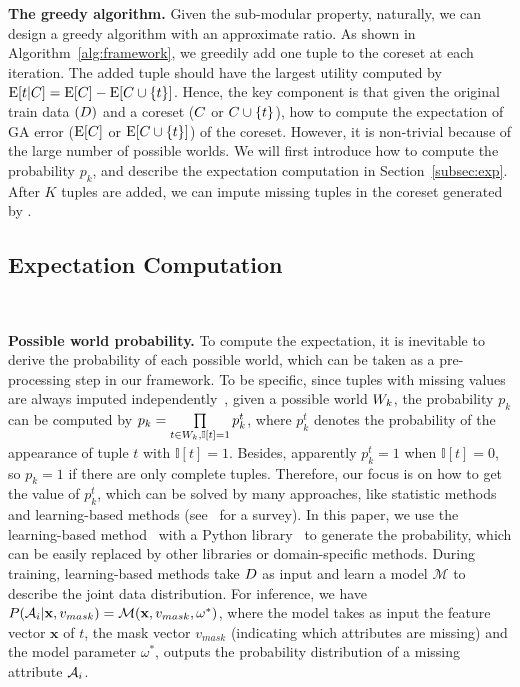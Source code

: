 \noindent \textbf{The greedy algorithm.} Given the sub-modular property, naturally, we can design a greedy algorithm with an approximate ratio. As shown in Algorithm~\ref{alg:framework}, we greedily add one tuple to the coreset at each iteration. The added tuple  should have the  largest utility computed by $\mathrm{E}[t|C] = \mathrm{E}[C] - \mathrm{E}[C \cup \{t\}]$. Hence, the key component is that given the original train data $(D)$ and a coreset ($C$ or $C \cup \{t\}$), how to compute the expectation of GA error ($\mathrm{E}[C]$ or $\mathrm{E}[C \cup \{t\}]$) of the coreset. However, it is non-trivial because of the large number of possible worlds.  We will first introduce how to compute the probability $p_k$, and describe the expectation computation in Section~\ref{subsec:exp}. After  $K$ tuples are added, we can impute missing tuples in the coreset generated by \ours.


\subsection{Expectation Computation}~\label{subsec:exp}

\noindent \textbf{Possible world probability.} To compute the expectation, it is inevitable to derive the probability of each possible world, which can be taken as a pre-processing step in our framework. 
To be specific, since tuples with missing values are always imputed independently~\cite{miao2022experimental}, given a possible world $W_k$, the probability $p_k$ can be computed by $p_k = \prod\limits_{t\in W_k, \mathbb{I}[t] = 1} p_k^t$, where $p_k^t$ denotes the probability of the appearance of tuple $t$ with $\mathbb{I}[t] = 1$. Besides, apparently  $p_k^t = 1$ when $\mathbb{I}[t] = 0$, so $p_k=1$ if there are only complete tuples.
Therefore, our focus is on how to get the value of  $p_k^t$, which can be solved by many approaches, like statistic methods and learning-based methods (see~\cite{miao2022experimental} for a survey). 
%
In this paper, we use the learning-based method~\cite{datawig} with a Python library~\cite{datawigpy} to generate the probability, which can be easily replaced by other libraries or domain-specific methods.
%
%
 During training, learning-based methods take $D$ as input and learn a model $\mathcal{M}$ to describe the joint data distribution.
 For inference,  we have 
$ P(\mathcal{A}_i | \mathbf{x}, v_{mask}) = \mathcal{M}(\mathbf{x}, v_{mask}, \omega^*)$, where the model takes as input the feature vector $\mathbf{x}$ of $t$, the mask vector $v_{mask}$ (indicating which attributes are missing) and the model parameter $\omega^*$, outputs the probability distribution of a missing attribute $\mathcal{A}_i$.
 
